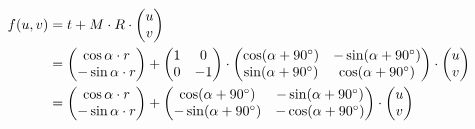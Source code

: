 \documentclass[a4paper,10pt,DIV=14]{scrartcl}
\begin{document}
\begin{align*}
f(u,v) &= 
t + M \cdot R \cdot
\begin{pmatrix}
u \\
v \\
\end{pmatrix} \\
&= 
\begin{pmatrix}
\cos \alpha \cdot r \\
-\sin \alpha \cdot r \\
\end{pmatrix}
+ 
\begin{pmatrix}
1 & 0 \\
0 & -1 \\
\end{pmatrix}
\cdot
\begin{pmatrix}
\cos(\alpha + 90 \degree) & -\sin(\alpha + 90 \degree) \\
\sin(\alpha + 90 \degree) & \cos(\alpha + 90 \degree) \\
\end{pmatrix}
\cdot
\begin{pmatrix}
u \\
v \\
\end{pmatrix}
\\
&= 
\begin{pmatrix}
\cos \alpha \cdot r\\
-\sin \alpha \cdot r\\
\end{pmatrix}
+ 
\begin{pmatrix}
\cos(\alpha + 90 \degree) & -\sin(\alpha + 90 \degree) \\
-\sin(\alpha + 90 \degree) & -\cos(\alpha + 90 \degree) \\
\end{pmatrix}
\cdot
\begin{pmatrix}
u \\
v \\
\end{pmatrix}
\\
\end{align*}
\end{document}
